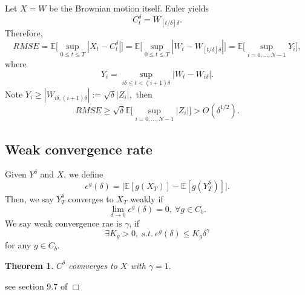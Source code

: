 \documentclass{article}
\newtheorem{theorem}{Theorem}
\newenvironment{proof}{\noindent {\sc Proof:}}{$\Box$} %
\begin{document}
Let $X = W$ be the Brownian motion itself.
Euler yields
$$C_{t}^{\delta} = W_{[t/\delta] \delta}.$$
Therefore, 
$$RMSE = 
\mathbb E  \Big [\sup_{0 \le t\le T} |X_{t} - C_{t}^{\delta}| \Big] 
= \mathbb E  \Big [\sup_{0 \le t\le T} |W_{t} - W_{[t/\delta]\delta}| \Big] 
=  \mathbb E  \Big [\sup_{i = 0, \ldots, N-1} Y_{i} \Big],
$$
where 
$$Y_{i} = \sup_{i\delta \le t < (i+1) \delta} |W_{t} - W_{i\delta}|.$$
Note $Y_{i} \ge |W_{i\delta, (i+1)\delta}| := \sqrt \delta |Z_{i}|,$ then 
$$RMSE \ge  \sqrt \delta  \mathbb E  
\Big [\sup_{i = 0, \ldots, N-1} |Z_{i}| \Big ]
> O(\delta^{1/2}).$$

\subsection{Weak convergence rate}
Given $Y^{\delta}$ and $X$, we define
$$e^{g} (\delta) = \Big| \mathbb E[ g(X_{T})] - 
\mathbb E[g (Y^{\delta}_{T})] \Big|.$$
Then, we say $Y^{\delta}_{T} $ converges to $X_{T}$ weakly if
$$\lim_{\delta\to 0} e^{g} (\delta) = 0, \ \forall g \in C_{b}.$$
We say weak convergence rae is $\gamma$, if
$$\exists K_{g} >0, \ s.t. \ e^{g}(\delta) \le K_{g} \delta^{\gamma}$$
for any $g\in C_{b}$.

\begin{theorem}
 $C^{\delta}$ covnverges to $X$ with $\gamma = 1.$
\end{theorem}
\begin{proof}
 see section 9.7 of  \cite{KP92}
\end{proof}


%
%

\end{document}
